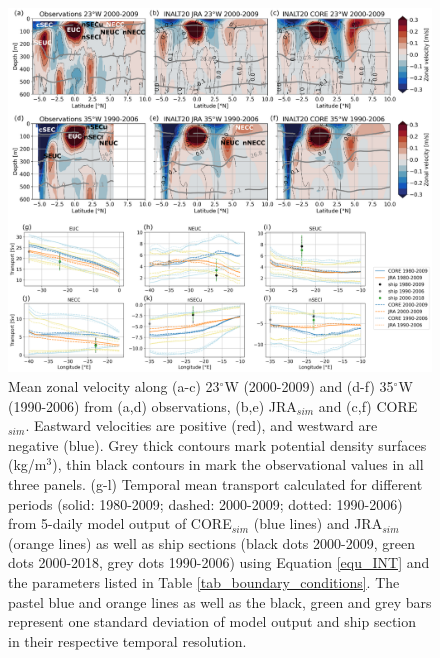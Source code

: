 \documentclass[os, manuscript]{copernicus}
\begin{document}
\begin{figure}[t]
	\includegraphics[width=12cm]{../../figures/paper/f02_23w_35w_mean_vel_and_transport.eps}
	\caption{Mean zonal velocity along (a-c) 23$^{\circ}$W (2000-2009) and (d-f) 35$^{\circ}$W (1990-2006) from (a,d) observations, (b,e) JRA$_{sim}$ and (c,f) CORE$_{sim}$. Eastward velocities are positive (red), and westward are negative (blue). Grey thick contours mark potential density surfaces (kg/m$^3$), thin black contours in mark the observational values in all three panels. (g-l) Temporal mean transport calculated for different periods (solid: 1980-2009; dashed: 2000-2009; dotted: 1990-2006) from 5-daily model output of CORE$_{sim}$ (blue lines) and JRA$_{sim}$ (orange lines) as well as ship sections (black dots 2000-2009, green dots 2000-2018, grey dots 1990-2006) using Equation \ref{equ_INT} and the parameters listed in Table \ref{tab_boundary_conditions}. The pastel blue and orange lines as well as the black, green and grey bars represent one standard deviation of model output and ship section in their respective temporal resolution.}
	\label{fig_mean_vel}
\end{figure}
\end{document}

